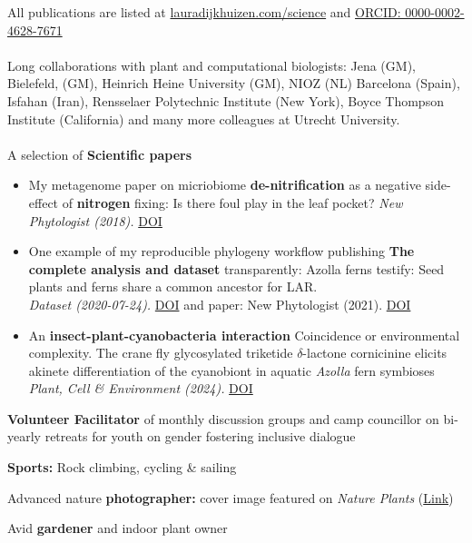 \documentclass[a4paper,10pt]{article}
\begin{document}
\noindent All publications are listed at \href{https://lauradijkhuizen.com/science}{lauradijkhuizen.com/science}  and 
\textcolor[HTML]{A6CE39}{\faOrcid}\href{https://orcid.org/0000-0002-4628-7671}{ORCID: 0000-0002-4628-7671}
\\\\
\noindent Long collaborations with plant and computational biologists: Jena (GM), Bielefeld, (GM), Heinrich Heine University (GM), NIOZ (NL) Barcelona (Spain), Isfahan (Iran), Rensselaer Polytechnic Institute (New York), Boyce Thompson Institute (California) and many more colleagues at Utrecht University. \\
\\
\noindent
A selection of \textbf{Scientific papers}
  \begin{itemize}
    \item My metagenome paper on micriobiome \textbf{de-nitrification} as a negative side-effect of \textbf{nitrogen} fixing:
      Is there foul play in the leaf pocket?
      {\footnotesize\null\hfill\emph{New Phytologist (2018).} 
      \href{https://doi.org/10.1111/nph.14843}{DOI}
      }
    \item One example of my reproducible phylogeny workflow publishing \textbf{The complete analysis and dataset} transparently: 
    Azolla ferns testify: Seed plants and ferns share a common ancestor for LAR. \\
       {\footnotesize\null\hfill\emph{Dataset (2020-07-24).} \href{https://doi.org/10.5281/zenodo.3959057}{DOI}
      and {paper: New Phytologist (2021).} \href{https://doi.org/10.1111/nph.16896}{DOI}
      }
    \item An \textbf{insect-plant-cyanobacteria interaction} Coincidence or environmental complexity. 
      The crane fly glycosylated triketide $\delta$-lactone cornicinine elicits akinete differentiation of the cyanobiont in aquatic \textit{Azolla} fern symbioses  \\
      {\footnotesize\null\hfill\emph{Plant, Cell \& Environment (2024).} \href{https://doi.org/10.1111/pce.14907}{DOI}
      }
  \end{itemize}

\vfill

\begin{description}
  \raggedright
  \item \textbf{Volunteer Facilitator} of monthly discussion groups and camp councillor on bi-yearly retreats for youth on gender fostering inclusive dialogue
  \item \textbf{Sports:} Rock climbing, cycling \& sailing
  \item Advanced nature \textbf{photographer:} cover image featured on \emph{Nature Plants} (\href{https://lauralwd.github.io/photography/}{Link})
  \item Avid \textbf{gardener} and indoor plant owner
\end{description}
\end{document}
